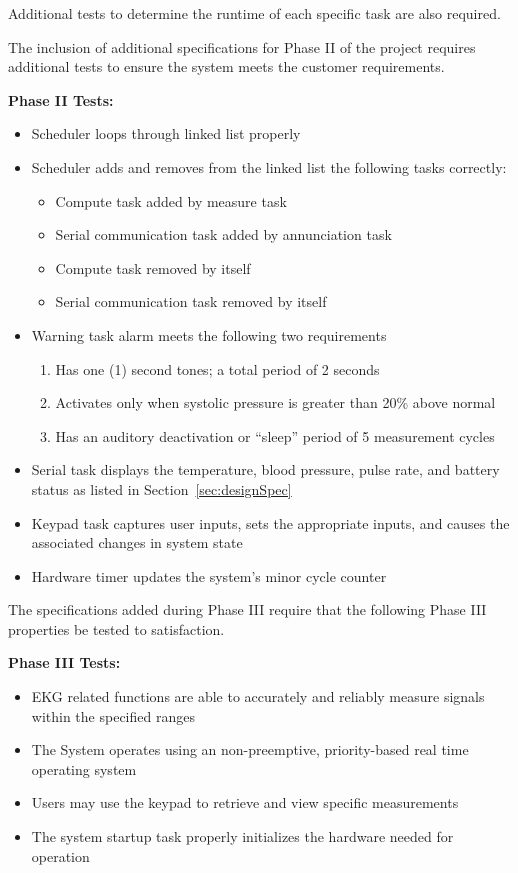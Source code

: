 \documentclass[12pt]{article} %
\begin{document}
    Additional tests to determine the runtime of each specific task are also
    required.

    The inclusion of additional specifications for Phase II of the project
    requires additional tests to ensure the system meets the customer
    requirements.

    \textbf{Phase II Tests:}
    \begin{itemize}
      \item Scheduler loops through linked list properly
      \item Scheduler adds and removes from the linked list the following tasks
	correctly:
	\begin{itemize}
	  \item Compute task added by measure task
	  \item Serial communication task added by annunciation task
	  \item Compute task removed by itself
	  \item Serial communication task removed by itself
	\end{itemize}
      \item Warning task alarm meets the following two requirements
	\begin{enumerate}
	  \item Has one (1) second tones; a total period of 2 seconds
	  \item Activates only when systolic pressure is greater than 20\% above
	    normal
	  \item Has an auditory deactivation or ``sleep'' period of 5
	    measurement cycles
	\end{enumerate}
	\item Serial task displays the temperature, blood pressure, pulse rate,
	  and battery status as listed in Section~\ref{sec:designSpec}
	\item Keypad task captures user inputs, sets the appropriate inputs,
	  and causes the associated changes in system state
	\item Hardware timer updates the system's minor cycle counter
    \end{itemize}
		
		The specifications added during Phase III require that the following Phase
		III properties be tested to satisfaction.

		\textbf{Phase III Tests:}
		\begin{itemize}
			\item EKG related functions are able to accurately and reliably measure signals within the specified ranges
			\item The System operates using an non-preemptive, priority-based real time operating system
			\item Users may use the keypad to retrieve and view specific measurements
			\item The system startup task properly initializes the hardware needed for operation
		\end{itemize}
\end{document}
